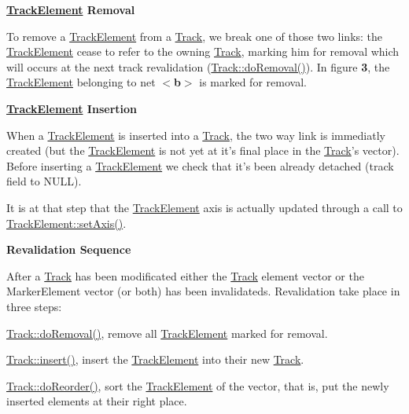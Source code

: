 {\bfseries \hyperlink{classKite_1_1TrackElement}{Track\-Element} Removal}

To remove a \hyperlink{classKite_1_1TrackElement}{Track\-Element} from a \hyperlink{classKite_1_1Track}{Track}, we break one of those two links\-: the \hyperlink{classKite_1_1TrackElement}{Track\-Element} cease to refer to the owning \hyperlink{classKite_1_1Track}{Track}, marking him for removal which will occurs at the next track revalidation (\hyperlink{classKite_1_1Track_abfffcd781865b94f62f27a1e7be99a38}{Track\-::do\-Removal()}). In figure {\bfseries 3}, the \hyperlink{classKite_1_1TrackElement}{Track\-Element} belonging to net {\bfseries $<$b$>$} is marked for removal.

 {\bfseries \hyperlink{classKite_1_1TrackElement}{Track\-Element} Insertion}

When a \hyperlink{classKite_1_1TrackElement}{Track\-Element} is inserted into a \hyperlink{classKite_1_1Track}{Track}, the two way link is immediatly created (but the \hyperlink{classKite_1_1TrackElement}{Track\-Element} is not yet at it's final place in the \hyperlink{classKite_1_1Track}{Track}'s vector). Before inserting a \hyperlink{classKite_1_1TrackElement}{Track\-Element} we check that it's been already detached ({\ttfamily track} field to {\ttfamily N\-U\-L\-L}).

It is at that step that the \hyperlink{classKite_1_1TrackElement}{Track\-Element} axis is actually updated through a call to \hyperlink{classKite_1_1TrackElement_a45e685b1e3ee630d24bf43746553af4c}{Track\-Element\-::set\-Axis()}.

{\bfseries Revalidation Sequence}

After a \hyperlink{classKite_1_1Track}{Track} has been modificated either the \hyperlink{classKite_1_1Track}{Track} element vector or the Marker\-Element vector (or both) has been invalidateds. Revalidation take place in three steps\-:
\begin{DoxyItemize}
\item \hyperlink{classKite_1_1Track_abfffcd781865b94f62f27a1e7be99a38}{Track\-::do\-Removal()}, remove all \hyperlink{classKite_1_1TrackElement}{Track\-Element} marked for removal.
\item \hyperlink{classKite_1_1Track_aa392ba7cf1e3e485aac11cf326e31918}{Track\-::insert()}, insert the \hyperlink{classKite_1_1TrackElement}{Track\-Element} into their new \hyperlink{classKite_1_1Track}{Track}.
\item \hyperlink{classKite_1_1Track_aaccb9224f5b38ecd8506fd1eec9ef5ca}{Track\-::do\-Reorder()}, sort the \hyperlink{classKite_1_1TrackElement}{Track\-Element} of the vector, that is, put the newly inserted elements at their right place.
\end{DoxyItemize}


